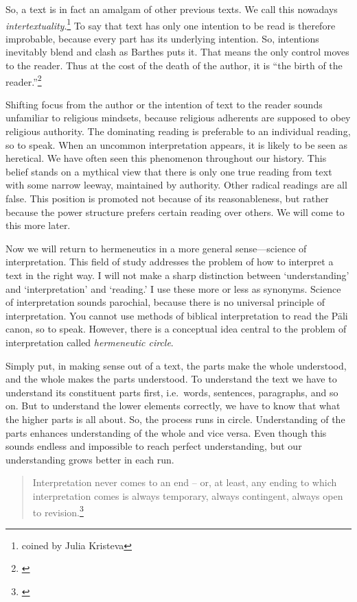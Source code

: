 So, a text is in fact an amalgam of other previous texts. We call this nowadays \emph{intertextuality}.\footnote{coined by Julia Kristeva} To say that text has only one intention to be read is therefore improbable, because every part has its underlying intention. So, intentions inevitably blend and clash as Barthes puts it. That means the only control moves to the reader. Thus at the cost of the death of the author, it is ``the birth of the reader.''\footnote{\citealp[p.~148]{barthes:image}}

Shifting focus from the author or the intention of text to the reader sounds unfamiliar to religious mindsets, because religious adherents are supposed to obey religious authority. The dominating reading is preferable to an individual reading, so to speak. When an uncommon interpretation appears, it is likely to be seen as heretical. We have often seen this phenomenon throughout our history. This belief stands on a mythical view that there is only one true reading from text with some narrow leeway, maintained by authority. Other radical readings are all false. This position is promoted not because of its reasonableness, but rather because the power structure prefers certain reading over others. We will come to this more later.

Now we will return to hermeneutics in a more general sense---science of interpretation. This field of study addresses the problem of how to interpret a text in the right way. I will not make a sharp distinction between `understanding' and `interpretation' and `reading.' I use these more or less as synonyms. Science of interpretation sounds parochial, because there is no universal principle of interpretation. You cannot use methods of biblical interpretation to read the P\=ali canon, so to speak. However, there is a conceptual idea central to the problem of interpretation called \emph{hermeneutic circle}.

Simply put, in making sense out of a text, the parts make the whole understood, and the whole makes the parts understood. To understand the text we have to understand its constituent parts first, i.e.\ words, sentences, paragraphs, and so on. But to understand the lower elements correctly, we have to know that what the higher parts is all about. So, the process runs in circle. Understanding of the parts enhances understanding of the whole and vice versa. Even though this sounds endless and impossible to reach perfect understanding, but our understanding grows better in each run.

\begin{quote}
Interpretation never comes to an end -- or, at least, any ending to which interpretation comes is always temporary, always contingent, always open to revision.\footnote{\citealp[p.~3]{malpas:intro}}
\end{quote}

